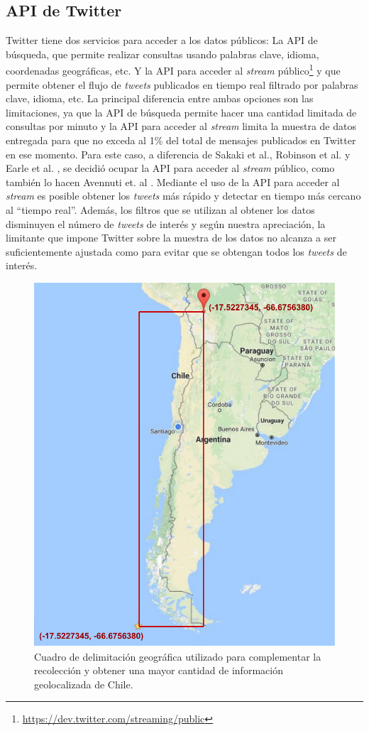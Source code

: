 \subsection{API de Twitter}

Twitter tiene dos servicios para acceder a los datos públicos: 
%
La API de búsqueda, que permite realizar consultas usando palabras clave, idioma, coordenadas geográficas, etc. 
%
Y la API para acceder al \textit{stream} público\footnote{\url{https://dev.twitter.com/streaming/public}} y que permite obtener el flujo de \textit{tweets} publicados en tiempo real filtrado por palabras clave, idioma, etc.
%
La principal diferencia entre ambas opciones son las limitaciones, ya que la API de búsqueda permite hacer una cantidad limitada de consultas por minuto y la API para acceder al \textit{stream} limita la muestra de datos entregada para que no exceda al 1\% del total de mensajes publicados en Twitter en ese momento.
% 
Para este caso, a diferencia de Sakaki et al.\cite{sakaki2013tweet}, Robinson et al. \cite{robinson2013sensitive} y Earle et al. \cite{earle2012twitter}, se decidió ocupar la API para acceder al \textit{stream} público, como también lo hacen Avennuti et. al \cite{avvenuti2014earthquake}.
%
Mediante el uso de la API para acceder al \textit{stream} es posible obtener los \textit{tweets} más rápido y detectar en tiempo más cercano al ``tiempo real''. Además, los filtros que se utilizan al obtener los datos disminuyen el número de \textit{tweets} de interés y según nuestra apreciación, la limitante que impone Twitter sobre la muestra de los datos no alcanza a ser suficientemente ajustada como para evitar que se obtengan todos los \textit{tweets} de interés. 

\begin{figure}[h]
	\centering
	\includegraphics[width=0.5\linewidth]{imagenes/boundingbox.pdf}
	\caption{Cuadro de delimitación geográfica utilizado para complementar la recolección y obtener una mayor cantidad de información geolocalizada de Chile.}
	\label{img:boundingbox}
\end{figure}

